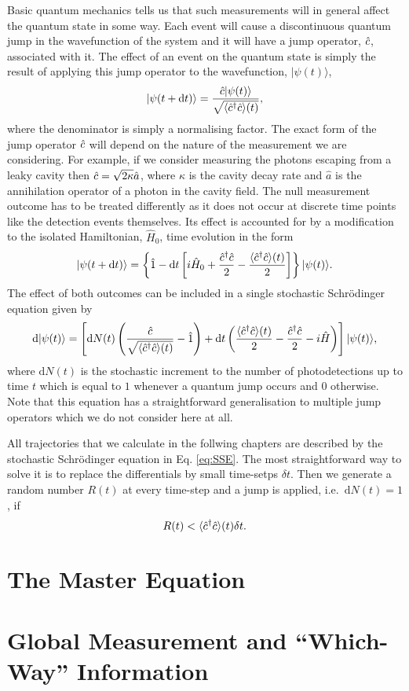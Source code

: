 Basic quantum mechanics tells us that such measurements will in
general affect the quantum state in some way. Each event will cause a
discontinuous quantum jump in the wavefunction of the system and it
will have a jump operator, $\hat{c}$, associated with it. The effect of an
event on the quantum state is simply the result of applying this jump
operator to the wavefunction, $| \psi (t) \rangle$,
\begin{equation}
  | \psi(t + \mathrm{d}t) \rangle = \frac{\hat{c} | \psi(t) \rangle}
  {\sqrt{\langle \hat{c}^\dagger \hat{c} \rangle (t)}},
\end{equation}
where the denominator is simply a normalising factor. The exact form
of the jump operator $\hat{c}$ will depend on the nature of the measurement
we are considering. For example, if we consider measuring the photons
escaping from a leaky cavity then $\hat{c} = \sqrt{2 \kappa} \hat{a}$,
where $\kappa$ is the cavity decay rate and $\hat{a}$ is the
annihilation operator of a photon in the cavity field. The null
measurement outcome has to be treated differently as it does not occur
at discrete time points like the detection events themselves. Its
effect is accounted for by a modification to the isolated Hamiltonian,
$\hat{H}_0$, time evolution in the form
\begin{equation}
  | \psi (t + \mathrm{d}t) \rangle = \left\{ \hat{1} - \mathrm{d}t
    \left[ i \hat{H}_0 + \frac{\hat{c}^\dagger \hat{c}}{2} - \frac{\langle \hat{c}^\dagger \hat{c}
        \rangle (t)}{2} \right] \right\} | \psi (t) \rangle.
\end{equation}
The effect of both outcomes can be included in a single stochastic
Schr\"{o}dinger equation given by
\begin{equation}
  \label{eq:SSE}
  \mathrm{d} | \psi(t) \rangle = \left[ \mathrm{d} N(t) \left(
      \frac{\hat{c}} {\sqrt{ \langle \hat{c}^\dagger \hat{c} \rangle (t)}} - \hat{1} \right)
    + \mathrm{d} t \left( \frac{\langle \hat{c}^\dagger \hat{c} \rangle (t)}{2} -
      \frac{ \hat{c}^\dagger \hat{c}}{2} - i \hat{H} \right) \right] | \psi(t) \rangle,
\end{equation}
where $\mathrm{d}N(t)$ is the stochastic increment to the number of
photodetections up to time $t$ which is equal to $1$ whenever a
quantum jump occurs and $0$ otherwise. Note that this equation has a
straightforward generalisation to multiple jump operators which we do
not consider here at all.

All trajectories that we calculate in the follwing chapters are
described by the stochastic Schr\"{o}dinger equation in
Eq. \eqref{eq:SSE}. The most straightforward way to solve it is to
replace the differentials by small time-setps $\delta t$. Then we
generate a random number $R(t)$ at every time-step and a jump is
applied, i.e.~$\mathrm{d}N(t) = 1$, if 
\begin{equation}
  R(t) < \langle \hat{c}^\dagger \hat{c} \rangle (t) \delta t.
\end{equation}

\section{The Master Equation}

\section{Global Measurement and ``Which-Way'' Information}